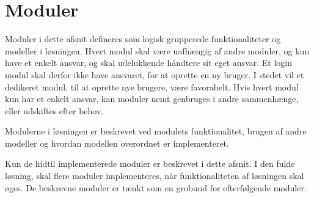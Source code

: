 \section{Moduler}
\label{sec:moduler}

Moduler i dette afsnit defineres som logisk grupperede funktionaliteter og modeller i løsningen. Hvert modul skal være uafhængig af andre moduler, og kun have et enkelt ansvar, og skal udelukkende håndtere sit eget ansvar. Et login modul skal derfor ikke have ansvaret, for at oprette en ny bruger. I stedet vil et dedikeret modul, til at oprette nye brugere, være favorabelt. Hvis hvert modul kun har et enkelt ansvar, kan moduler nemt genbruges i andre sammenhænge, eller udskiftes efter behov.

Modulerne i løsningen er beskrevet ved modulets funktionalitet, brugen af andre modeller og hvordan modellen overordnet er implementeret.

Kun de hidtil implementerede moduler er beskrevet i dette afsnit. I den fulde løsning, skal flere moduler implementeres, når funktionaliteten af løsningen skal øges. De beskrevne moduler er tænkt som en grobund for efterfølgende moduler.







